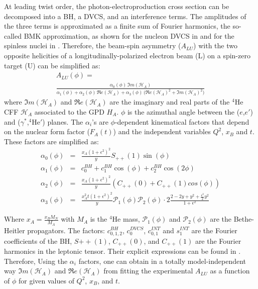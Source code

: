 \documentclass[nofootinbib,twocolumn,showpacs,prl,superscriptaddress,secnumarabic,amssymb,nobibnotes,aps,floatfix]{revtex4}
\begin{document}
At leading twist order, the photon-electroproduction cross section can be 
decomposed into a BH, a DVCS, and an interference terms. The amplitudes of the 
three terms is approximated as a finite sum of Fourier harmonics, the so-called 
BMK approximation, as shown for the nucleon DVCS in \cite{Belitsky:2001ns} and 
for the spinless nuclei in \cite{Kirchner:2003wt,Belitsky:2008bz}. Therefore, 
the beam-spin asymmetry ($A_{LU}$) with the two opposite helicities of a 
longitudinally-polarized electron beam (L) on a spin-zero target (U) can be 
simplified as:
\small
\begin{equation}
\begin{split}
A_{LU}(\phi) =~~~~~~~~~~~~~~~~~~~~~~~~~~~~~~~~~~~~~~~~~~~~~~~~~~~~~~~~~\\
 \frac{\alpha_{0}(\phi) \, \Im m(\mathcal{H}_{A})}
{\alpha_{1}(\phi) + \alpha_{2}(\phi) \, \Re e(\mathcal{H}_{A}) + \alpha_{3}(\phi) \, 
\big( 
\Re e(\mathcal{H}_{A})^{2} + \Im m(\mathcal{H}_{A})^{2} \big)}
\label{eq:A_LU-coh}
\end{split}
\end{equation}
\normalsize
where $\Im m(\mathcal{H}_{A})$ and $\Re e(\mathcal{H}_{A})$ are the imaginary 
and real parts of the $^4$He CFF $\mathcal{H}_{A}$ associated to the GPD $H_A$. 
$\phi$ is the azimuthal angle between the ($e$,$e'$) and 
($\gamma^{*}$,$^4$He$'$) planes. The $\alpha_{i}$'s are $\phi$-dependent 
kinematical factors that depend on the nuclear form factor ($F_{A}(t)$) and the 
independent variables $Q^2$, $x_{B}$ and $t$. These factors are simplified as:
\small
\begin{eqnarray}
   \alpha_0 (\phi) & = &\frac{x_{A}(1+\epsilon^2)^2}{y} S_{++}(1) \sin(\phi)\\
    \alpha_1 (\phi) & = & c_0^{BH}+c_1^{BH} \cos({\phi})+c_2^{BH} \cos(2\phi)\\ 
   \alpha_2 (\phi) & = & \frac{x_{A}(1+\epsilon^2)^2}{y}  \left( C_{++}(0) +  
C_{++}(1) cos(\phi) \right)\\
\alpha_3 (\phi) &=& \frac{x^{2}_{A}t(1+\epsilon^2)^2}{y} {\mathcal P}_1(\phi) 
{\mathcal P}_2(\phi) \cdot 2 \frac{2-2y+y^2 + \frac{\epsilon^2}{2}y^2}{1 + 
\epsilon^2}
\end{eqnarray}
\normalsize

Where $x_{A} = \frac{x_{B}M_{N}}{M_{A}}$ with $M_{A}$ is the $^4$He mass, 
$\mathcal{P}_1(\phi)$ and $\mathcal {P}_2(\phi)$ are the Bethe-Heitler
propagators. The factors: $c_{0,1,2}^{BH}$, $c_0^{DVCS}$, $c_{0,1}^{INT}$ and
$s_1^{INT}$ are the Fourier coefficients of the BH, $S{++}(1)$, $C_{++}(0)$, 
and $C_{++}(1)$ are the Fourier harmonics in the leptonic tensor. Their 
explicit expressions can be found in \cite{Belitsky:2008bz}.  Therefore, Using 
the $\alpha_{i}$ factors, one can obtain in a totally model-independent way 
$\Im m(\mathcal{H}_{A})$ and $\Re e(\mathcal{H}_{A})$ from fitting the 
experimental $A_{LU}$ as a function of $\phi$ for given values of $Q^2$, 
$x_{B}$, and $t$.
\end{document}
